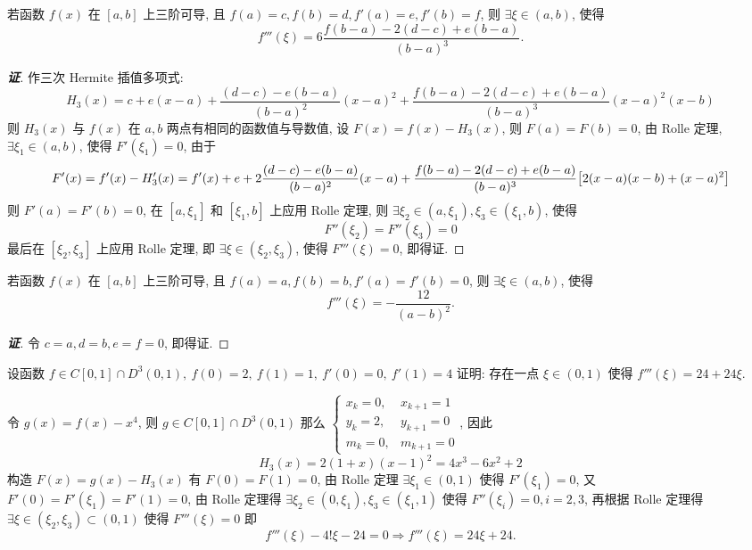 \begin{theorem}
    若函数 $f(x)\text{ 在 }[a,b]$ 上三阶可导, 且 $f(a)=c,f(b)=d,f'(a)=e,f'(b)=f$, 则 $\exists\xi\in(a,b)$, 使得 $$f'''(\xi)=6\dfrac{f(b-a)-2(d-c)+e(b-a)}{(b-a)^3}.$$
\end{theorem}
\begin{proof}[{\songti \textbf{证}}]
    作三次 Hermite 插值多项式: $$H_3(x)=c+e(x-a)+\dfrac{(d-c)-e(b-a)}{(b-a)^2}(x-a)^2+\dfrac{f(b-a)-2(d-c)+e(b-a)}{(b-a)^3}(x-a)^2(x-b)$$
    则 $H_3(x)$ 与 $f(x)$ 在 $a,b$ 两点有相同的函数值与导数值, 设 $F(x)=f(x)-H_3(x)$, 则 $F(a)=F(b)=0$, 由 Rolle 定理, $\exists\xi_1\in(a,b)$, 使得 $F'(\xi_1)=0$, 
    由于 $$F'(x)=f'(x)-H_3'(x)=f'(x)+e+2\dfrac{(d-c)-e(b-a)}{(b-a)^2}(x-a)+\dfrac{f(b-a)-2(d-c)+e(b-a)}{(b-a)^3}\qty[2(x-a)(x-b)+(x-a)^2]$$
    则 $F'(a)=F'(b)=0$, 在 $[a,\xi_1]$ 和 $[\xi_1,b]$ 上应用 Rolle 定理, 则 $\exists\xi_2\in(a,\xi_1),\xi_3\in(\xi_1,b)$, 使得 $$F''(\xi_2)=F''(\xi_3)=0$$
    最后在 $[\xi_2,\xi_3]$ 上应用 Rolle 定理, 即 $\exists\xi\in(\xi_2,\xi_3)$, 使得 $F'''(\xi)=0$, 即得证.
\end{proof}
\begin{inference}
    若函数 $f(x)\text{ 在 }[a,b]$ 上三阶可导, 且 $f(a)=a,f(b)=b,f'(a)=f'(b)=0$, 则 $\exists\xi\in(a,b)$, 使得 $$f'''(\xi)=-\dfrac{12}{(a-b)^2}.$$
\end{inference}
\begin{proof}[{\songti \textbf{证}}]
    令 $c=a,d=b,e=f=0$, 即得证. 
\end{proof}

\begin{example}
    设函数 $f\in C[0,1]\cap D^3(0,1),~f(0)=2,~f(1)=1,~f'(0)=0,~f'(1)=4$ 证明: 存在一点 $\xi\in(0,1)$ 使得 $f'''(\xi)=24+24\xi.$
\end{example}
\begin{solution}
    令 $g(x)=f(x)-x^4$, 则 $g\in C[0,1]\cap D^3(0,1)$ 那么 $\begin{cases}
            x_k=0  , & x_{k+1}=1 \\
            y_k=2  , & y_{k+1}=0 \\
            m_k=0  , & m_{k+1}=0
        \end{cases}$, 因此
        $$H_3(x)=2(1+x)(x-1)^2=4x^3-6x^2+2$$
        构造 $F(x)=g(x)-H_3(x)$ 有 $F(0)=F(1)=0$, 由 Rolle 定理 $\exists\xi_1\in(0,1)$ 使得 $F'(\xi_1)=0$, 
        又 $F'(0)=F'(\xi_1)=F'(1)=0$, 由 Rolle 定理得 $\exists \xi_2\in(0,\xi_1),\xi_3\in(\xi_1,1)$ 使得 $F''(\xi_i)=0,i=2,3$, 
        再根据 Rolle 定理得 $\exists\xi\in(\xi_2,\xi_3)\subset(0,1)$ 使得 $F'''(\xi)=0$ 即
        $$f'''(\xi)-4!\xi-24=0\Rightarrow f'''(\xi)=24\xi+24.$$
\end{solution}